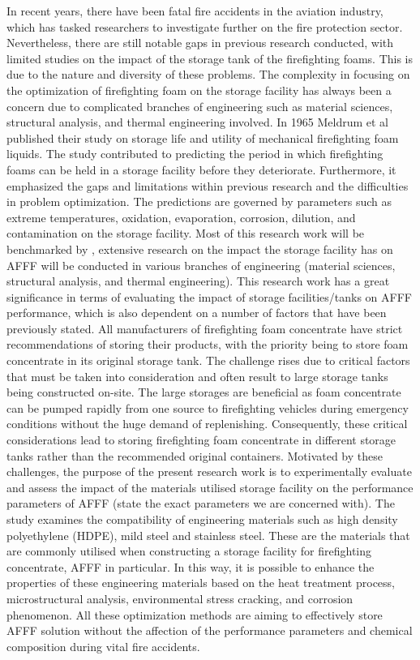In recent years, there have been fatal fire accidents in the aviation industry, which has tasked researchers to investigate further on the fire protection sector. Nevertheless, there are still notable gaps in previous research conducted, with limited studies on the impact of the storage tank of the firefighting foams. This is due to the nature and diversity of these problems. The complexity in focusing on the optimization of firefighting foam on the storage facility has always been a concern due to complicated branches of engineering such as material sciences, structural analysis, and thermal engineering involved. 
In 1965 Meldrum et al \cite{meldrum1965storage} published their study on storage life and utility of mechanical firefighting foam liquids. The study contributed to predicting the period in which firefighting foams can be held in a storage facility before they deteriorate. Furthermore, it emphasized the gaps and limitations within previous research and the difficulties in problem optimization. The predictions are governed by parameters such as extreme temperatures, oxidation, evaporation, corrosion, dilution, and contamination on the storage facility. Most of this research work will be benchmarked by \cite{meldrum1965storage}, extensive research on the impact the storage facility has on AFFF will be conducted in various branches of engineering (material sciences, structural analysis, and thermal engineering).
This research work has a great significance in terms of evaluating the impact of storage facilities/tanks on AFFF performance, which is also dependent on a number of factors that have been previously stated. All manufacturers of firefighting foam concentrate have strict recommendations of storing their products, with the priority being to store foam concentrate in its original storage tank. The challenge rises due to critical factors that must be taken into consideration and often result to large storage tanks being constructed on-site. The large storages are beneficial as foam concentrate can be pumped rapidly from one source to firefighting vehicles during emergency conditions without the huge demand of replenishing. Consequently, these critical considerations lead to storing firefighting foam concentrate in different storage tanks rather than the recommended original containers.
 Motivated by these challenges, the purpose of the present research work is to experimentally evaluate and assess the impact of the materials utilised storage facility on the performance parameters of AFFF (state the exact parameters we are concerned with). The study examines the compatibility of engineering materials such as high density polyethylene (HDPE), mild steel and stainless steel. These are the materials that are commonly utilised when constructing a storage facility for firefighting concentrate, AFFF in particular. In this way, it is possible to enhance the properties of these engineering materials based on the heat treatment process, microstructural analysis, environmental stress cracking, and corrosion phenomenon. All these optimization methods are aiming to effectively store AFFF solution without the affection of the performance parameters and chemical composition during vital fire accidents. 

